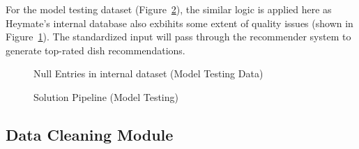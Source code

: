 \documentclass[
  11pt,
  a4paper,
  DIV=11,
  numbers=noendperiod]{scrartcl}
\begin{document}
For the model testing dataset (Figure~\ref{fig-testing-pipline}), the
similar logic is applied here as Heymate's internal database also
exbihits some extent of quality issues (shown in
Figure~\ref{fig-null-internal}). The standardized input will pass
through the recommender system to generate top-rated dish
recommendations.

\begin{figure}

\caption{\label{fig-null-internal}Null Entries in internal dataset
(Model Testing Data)}


\end{figure}%

\begin{figure}

\caption{\label{fig-testing-pipline}Solution Pipeline (Model Testing)}


\end{figure}%

\subsection{Data Cleaning Module}\label{data-cleaning-module}
\end{document}
